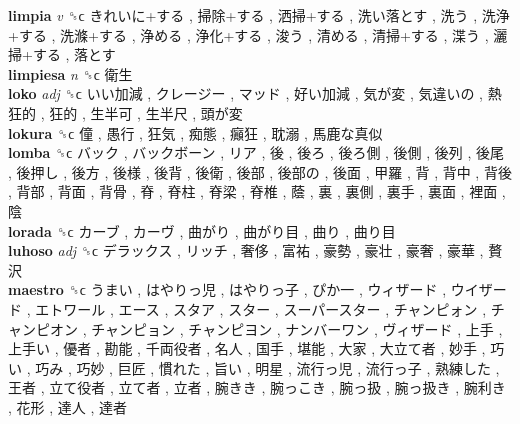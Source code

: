 \textbf{limpia} \emph{v}  ␝ϲ   きれいに+する ,  掃除+する ,  洒掃+する ,  洗い落とす ,  洗う ,  洗浄+する ,  洗滌+する ,  浄める ,  浄化+する ,  浚う ,  清める ,  清掃+する ,  渫う ,  灑掃+する ,  落とす   \\
\textbf{limpiesa} \emph{n}  ␝ϲ   衛生   \\
\textbf{loko} \emph{adj}  ␝ϲ   いい加減 ,  クレージー ,  マッド ,  好い加減 ,  気が変 ,  気違いの ,  熱狂的 ,  狂的 ,  生半可 ,  生半尺 ,  頭が変   \\
\textbf{lokura} ␝ϲ   僮 ,  愚行 ,  狂気 ,  痴態 ,  癲狂 ,  耽溺 ,  馬鹿な真似   \\
\textbf{lomba} ␝ϲ   バック ,  バックボーン ,  リア ,  後 ,  後ろ ,  後ろ側 ,  後側 ,  後列 ,  後尾 ,  後押し ,  後方 ,  後様 ,  後背 ,  後衛 ,  後部 ,  後部の ,  後面 ,  甲羅 ,  背 ,  背中 ,  背後 ,  背部 ,  背面 ,  背骨 ,  脊 ,  脊柱 ,  脊梁 ,  脊椎 ,  蔭 ,  裏 ,  裏側 ,  裏手 ,  裏面 ,  裡面 ,  陰   \\
\textbf{lorada} ␝ϲ   カーブ ,  カーヴ ,  曲がり ,  曲がり目 ,  曲り ,  曲り目   \\
\textbf{luhoso} \emph{adj}  ␝ϲ   デラックス ,  リッチ ,  奢侈 ,  富祐 ,  豪勢 ,  豪壮 ,  豪奢 ,  豪華 ,  贅沢   \\
\textbf{maestro} ␝ϲ   うまい ,  はやりっ児 ,  はやりっ子 ,  ぴか一 ,  ウィザード ,  ウイザード ,  エトワール ,  エース ,  スタア ,  スター ,  スーパースター ,  チャンピォン ,  チャンピオン ,  チャンピョン ,  チャンピヨン ,  ナンバーワン ,  ヴィザード ,  上手 ,  上手い ,  優者 ,  勘能 ,  千両役者 ,  名人 ,  国手 ,  堪能 ,  大家 ,  大立て者 ,  妙手 ,  巧い ,  巧み ,  巧妙 ,  巨匠 ,  慣れた ,  旨い ,  明星 ,  流行っ児 ,  流行っ子 ,  熟練した ,  王者 ,  立て役者 ,  立て者 ,  立者 ,  腕きき ,  腕っこき ,  腕っ扱 ,  腕っ扱き ,  腕利き ,  花形 ,  達人 ,  達者   \\
